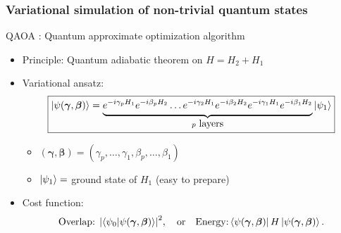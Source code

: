 \documentclass{beamer}
\theoremstyle{definition}
\begin{document}
\begin{frame}
\frametitle{Variational simulation of non-trivial quantum states}

QAOA \cite{QAOA}: Quantum approximate optimization algorithm


\begin{itemize}
	\item Principle: Quantum adiabatic theorem on $H = H_2 + H_1$

	
	\item Variational ansatz:
	\begin{equation*}
	\boxed{\left\vert{\psi(\bm{\gamma}, \bm{\beta})}\right\rangle = \underbrace{ \strut {e^{-i\gamma_p H_1}e^{-i\beta_p H_2}} \dots {e^{-i\gamma_2 H_1}e^{-i\beta_2 H_2}} {e^{-i\gamma_1 H_1}e^{-i\beta_1 H_2}}}_{ p \mbox{ layers}} \left\vert{\psi_1}\right\rangle}
	\end{equation*}
	\begin{itemize}
		\item $(\bm\gamma,\bm\beta) = (\gamma_p,\dots, \gamma_1,\beta_p,\dots, \beta_1)$
		
		\item $\left\vert{\psi_1}\right\rangle = $ ground state of $H_1$ (easy to prepare)
	\end{itemize}
	
	\item Cost function:
	\begin{equation*}
	\text{Overlap: } \abs{\braket{\psi_0}{\psi(\bm\gamma,\bm\beta)}}^2 ,\quad \text{or} \quad \text{Energy:} \left\langle{\psi(\bm\gamma,\bm\beta)}\right\vert H\left\vert{\psi(\bm\gamma,\bm\beta)}\right\rangle.
	\end{equation*}
\end{itemize}


\end{frame}

\end{document}
